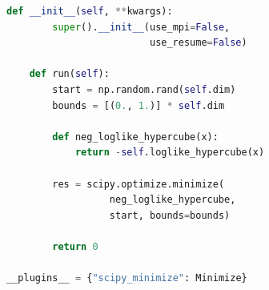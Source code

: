 \documentclass[aspectratio=169]{beamer}
\begin{document}
\begin{frame}[fragile]
\begin{columns}
\begin{lstlisting}[language=Python]
    def __init__(self, **kwargs):
        super().__init__(use_mpi=False,
                         use_resume=False)

    def run(self):
        start = np.random.rand(self.dim)
        bounds = [(0., 1.)] * self.dim

        def neg_loglike_hypercube(x):
            return -self.loglike_hypercube(x)

        res = scipy.optimize.minimize(
                  neg_loglike_hypercube,
                  start, bounds=bounds)

        return 0

__plugins__ = {"scipy_minimize": Minimize}
\end{lstlisting}
    \end{columns}
\end{frame}
\end{document}
